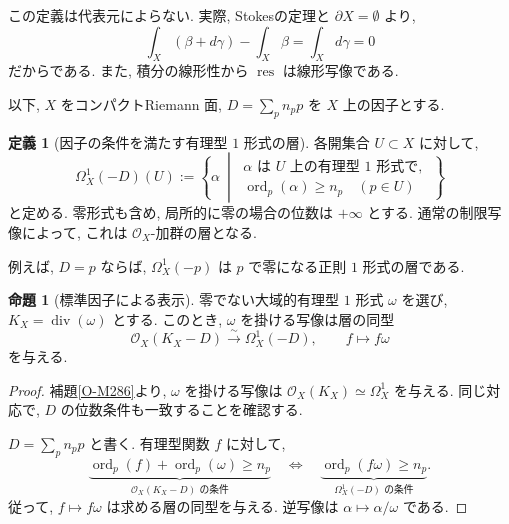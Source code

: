 \documentclass[dvipdfmx,a4paper,11pt]{article} %
\theoremstyle{definition}
\numberwithin{equation}{section}
\newtheorem{prop}[thm]{命題}
\newtheorem{dfn}[thm]{定義}
\begin{document}
この定義は代表元によらない.
実際, Stokesの定理と $\partial X=\emptyset$ より, 
\[
\int_X(\beta+d\gamma)-\int_X\beta
=\int_Xd\gamma=0
\]
だからである.
また, 積分の線形性から $\operatorname{res}$ は線形写像である.

以下, $X$ をコンパクトRiemann 面, 
$D=\sum_p n_p p$ を $X$ 上の因子とする.

\begin{dfn}[因子の条件を満たす有理型 $1$ 形式の層]\label{dfn-twisted-differentials}
各開集合 $U\subset X$ に対して, 
\[
\Omega_X^1(-D)(U)
:=
\left\{
\alpha\ \middle|\
\begin{array}{l}
\alpha\text{ は }U\text{ 上の有理型 }1\text{ 形式で, }\\
\operatorname{ord}_p(\alpha)\geq n_p
\quad(p\in U)
\end{array}
\right\}
\]
と定める.
零形式も含め, 局所的に零の場合の位数は $+\infty$ とする.
通常の制限写像によって, 
これは $\mathcal O_X$-加群の層となる.

例えば, $D=p$ ならば, 
$\Omega_X^1(-p)$ は $p$ で零になる正則 $1$ 形式の層である.
\end{dfn}

\begin{prop}[標準因子による表示]\label{prop-twisted-canonical}
零でない大域的有理型 $1$ 形式 $\omega$ を選び, 
$K_X=\operatorname{div}(\omega)$ とする.
このとき, $\omega$ を掛ける写像は層の同型
\[
\mathcal O_X(K_X-D)\xrightarrow{\sim}\Omega_X^1(-D),
\qquad f\longmapsto f\omega
\]
を与える.
\end{prop}

\begin{proof}
補題\ref{O-M286}より, $\omega$ を掛ける写像は
$\mathcal O_X(K_X)\simeq\Omega_X^1$ を与える.
同じ対応で, $D$ の位数条件も一致することを確認する.

$D=\sum_p n_p p$ と書く.
有理型関数 $f$ に対して,
\[
\underbrace{\operatorname{ord}_p(f)+\operatorname{ord}_p(\omega)\geq n_p}
_{\mathcal O_X(K_X-D)\text{ の条件}}
\quad\Longleftrightarrow\quad
\underbrace{\operatorname{ord}_p(f\omega)\geq n_p}
_{\Omega_X^1(-D)\text{ の条件}}.
\]
従って, $f\mapsto f\omega$ は求める層の同型を与える.
逆写像は $\alpha\mapsto\alpha/\omega$ である.
\end{proof}
\end{document}
